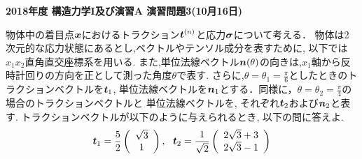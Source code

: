 \documentclass[10pt,a4j]{jarticle}
\newlength{\minitwocolumn}
\begin{document}
\newcommand{\fat}[1]{\mbox{\boldmath $#1$}}
\newcommand{\D}{\partial}
\newcommand{\w}{\omega}
\newcommand{\ga}{\alpha}
\newcommand{\gb}{\beta}
\newcommand{\gx}{\xi}
\newcommand{\gz}{\zeta}
\newcommand{\vhat}[1]{\hat{\fat{#1}}}
\newcommand{\spc}{\vspace{0.7\baselineskip}}
\newcommand{\halfspc}{\vspace{0.3\baselineskip}}

\pagestyle{empty}
\newcommand{\twofig}[2]
 {
   \begin{figure}[h]
     \begin{minipage}[t]{\minitwocolumn}
         \begin{center}   #1
         \end{center}
     \end{minipage}
         \hspace{\columnsep}
     \begin{minipage}[t]{\minitwocolumn}
         \begin{center} #2
         \end{center}
     \end{minipage}
   \end{figure}
 }
\begin{center}
{\Large \bf 2018年度 構造力学I及び演習A 演習問題3(10月16日)} \\
\end{center}
\vspace{5mm}
物体中の着目点$\fat{x}$におけるトラクション$\fat{t}^{(n)}$と応力$\fat{\sigma}$について考える．
物体は2次元的な応力状態にあるとし,ベクトルやテンソル成分を表すために, 以下では$x_1x_2$直角直交座標系を用いる.
また,単位法線ベクトル$\fat{n}(\theta)$の向きは,$x_1$軸から反時計回りの方向を正として測った角度$\theta$で表す.
さらに,$\theta=\theta_1=\frac{\pi}{6}$としたときのトラクションベクトルを$\fat{t}_1$, 
単位法線ベクトルを$\fat{n}_1$とする．同様に，$\theta=\theta_2=\frac{\pi}{4}$の場合のトラクションベクトルと
単位法線ベクトルを, それぞれ$\fat{t}_2$および$\fat{n}_2$と表す. 
トラクションベクトルが以下のように与えられるとき, 以下の問に答えよ.
\[
	\fat{t}_1=
	\frac{5}{2}
	\left(
		\begin{array}{c}
			\sqrt{3} \\
			1
		\end{array}
	\right), \ \ 
	\fat{t}_2=
	\frac{1}{\sqrt{2}}
	\left(
		\begin{array}{c}
			2\sqrt{3}+3 \\
			2\sqrt{3}-1
		\end{array}
	\right)
\]
\end{document}
